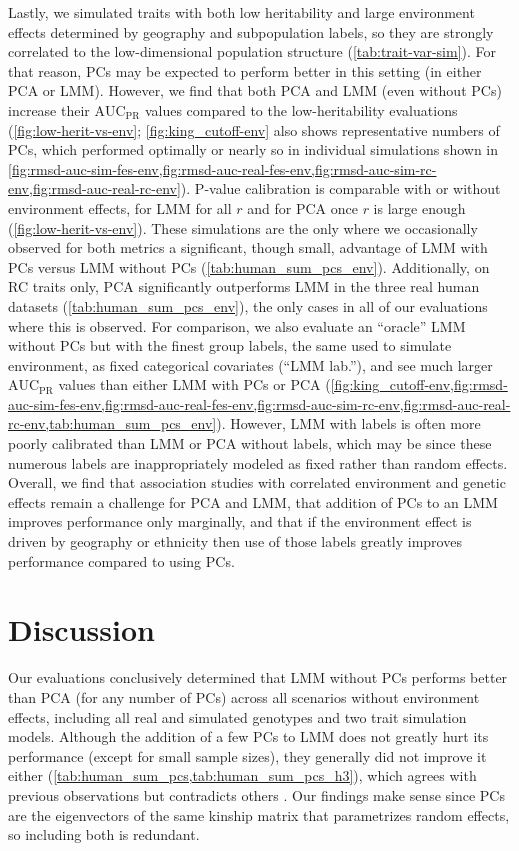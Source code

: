 \documentclass[11pt]{article}
\newcommand{\auc}{\text{AUC}_\text{PR}}
\begin{document}
\begin{linenumbers}
Lastly, we simulated traits with both low heritability and large environment effects determined by geography and subpopulation labels, so they are strongly correlated to the low-dimensional population structure (\cref{tab:trait-var-sim}).
For that reason, PCs may be expected to perform better in this setting (in either PCA or LMM).
However, we find that both PCA and LMM (even without PCs) increase their $\auc$ values compared to the low-heritability evaluations (\cref{fig:low-herit-vs-env}; \cref{fig:king_cutoff-env} also shows representative numbers of PCs, which performed optimally or nearly so in individual simulations shown in \cref{fig:rmsd-auc-sim-fes-env,fig:rmsd-auc-real-fes-env,fig:rmsd-auc-sim-rc-env,fig:rmsd-auc-real-rc-env}).
P-value calibration is comparable with or without environment effects, for LMM for all $r$ and for PCA once $r$ is large enough (\cref{fig:low-herit-vs-env}).
These simulations are the only where we occasionally observed for both metrics a significant, though small, advantage of LMM with PCs versus LMM without PCs (\cref{tab:human_sum_pcs_env}).
Additionally, on RC traits only, PCA significantly outperforms LMM in the three real human datasets (\cref{tab:human_sum_pcs_env}), the only cases in all of our evaluations where this is observed.
For comparison, we also evaluate an ``oracle'' LMM without PCs but with the finest group labels, the same used to simulate environment, as fixed categorical covariates (``LMM lab.''), and see much larger $\auc$ values than either LMM with PCs or PCA (\cref{fig:king_cutoff-env,fig:rmsd-auc-sim-fes-env,fig:rmsd-auc-real-fes-env,fig:rmsd-auc-sim-rc-env,fig:rmsd-auc-real-rc-env,tab:human_sum_pcs_env}).
However, LMM with labels is often more poorly calibrated than LMM or PCA without labels, which may be since these numerous labels are inappropriately modeled as fixed rather than random effects.
Overall, we find that association studies with correlated environment and genetic effects remain a challenge for PCA and LMM, that addition of PCs to an LMM improves performance only marginally, and that if the environment effect is driven by geography or ethnicity then use of those labels greatly improves performance compared to using PCs.

\section{Discussion}

Our evaluations conclusively determined that LMM without PCs performs better than PCA (for any number of PCs) across all scenarios without environment effects, including all real and simulated genotypes and two trait simulation models.
Although the addition of a few PCs to LMM does not greatly hurt its performance (except for small sample sizes), they generally did not improve it either (\cref{tab:human_sum_pcs,tab:human_sum_pcs_h3}), which agrees with previous observations \citep{liu_controlling_2011, janss_inferences_2012} but contradicts others \citep{zhao_arabidopsis_2007, price_new_2010}.
Our findings make sense since PCs are the eigenvectors of the same kinship matrix that parametrizes random effects, so including both is redundant.


\end{linenumbers}
\end{document}
